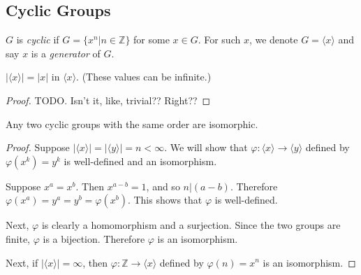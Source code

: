     
    \subsection{Cyclic Groups}
    
    \begin{defn} \label{def_cyclic_group}
        $G$ is \emph{cyclic} if $G = \{x^n | n \in \mathbb{Z}\}$ for some $x \in G$. For such $x$, we denote $G = \langle x \rangle$ and say $x$ is a \emph{generator} of $G$.
    \end{defn}
    
    \begin{prop} \label{prop_cyclic_group_order}
        $| \langle x \rangle | = |x|$ in $\langle x \rangle$. (These values can be infinite.)
    \end{prop}
    
    \begin{proof}
        TODO. Isn't it, like, trivial?? Right??
    \end{proof}
    
    \begin{thm} \label{thm_cyclic_isomorphic}
        Any two cyclic groups with the same order are isomorphic.
    \end{thm}
    
    \begin{proof}
        Suppose $| \langle x \rangle | = | \langle y \rangle | = n < \infty$. We will show that $\varphi: \langle x \rangle \to \langle y \rangle$ defined by $\varphi (x^k) = y^k$ is well-defined and an isomorphism.
        
        Suppose $x^a = x^b$. Then $x^{a-b} = 1$, and so $n | (a-b)$. Therefore $\varphi (x^a) = y^a = y^b = \varphi (x^b)$. This shows that $\varphi$ is well-defined.
        
        Next, $\varphi$ is clearly a homomorphism and a surjection. Since the two groups are finite, $\varphi$ is a bijection. Therefore $\varphi$ is an isomorphism.
        
        Next, if $| \langle x \rangle | = \infty$, then $\varphi: \mathbb{Z} \to \langle x \rangle$ defined by $\varphi (n) = x^n$ is an isomorphism.
    \end{proof}

